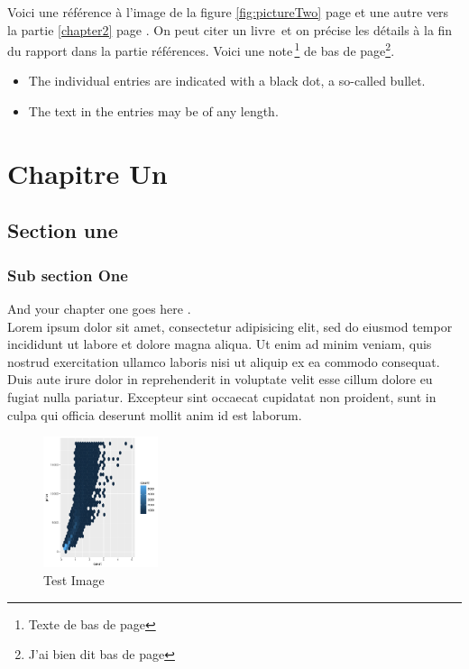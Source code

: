 \documentclass[a4paper, oneside, frenchb]{report}
\begin{document}
Voici une référence à l'image de la figure \ref{fig:pictureTwo} page \pageref{fig:pictureTwo} et une autre vers la partie \ref{chapter2} page \pageref{chapter2}.
On peut citer un livre\, \cite{caillois1} et on précise les détails à la fin du rapport dans la partie références.
Voici une note\,\footnote{Texte de bas de page} de bas de page\footnote{J'ai bien dit bas de page}.


\begin{itemize}
  \item The individual entries are indicated with a black dot, a so-called bullet.
  \item The text in the entries may be of any length.
\end{itemize}

\chapter{Chapitre Un}%
\label{chap:chapterone}

\section{Section une}
\label{chap:sectionone}

\subsection{Sub section One}

And your chapter one goes here \cite{web001,Nom2012}. \\
  Lorem ipsum dolor sit amet, consectetur adipisicing elit, sed do eiusmod
  tempor incididunt ut labore et dolore magna aliqua. Ut enim ad minim veniam, quis nostrud exercitation ullamco laboris nisi ut aliquip ex ea commodo consequat. Duis aute irure dolor in reprehenderit in voluptate velit esse
  cillum dolore eu fugiat nulla pariatur. Excepteur sint occaecat cupidatat non
  proident, sunt in culpa qui officia deserunt mollit anim id est laborum.

  \begin{figure}[h]%
    \center%
    \includegraphics[width=0.3\textwidth]{diamonds.pdf}
    \caption[This is a test image]{Test Image}\label{fig:test}%
  \end{figure}
\end{document}
